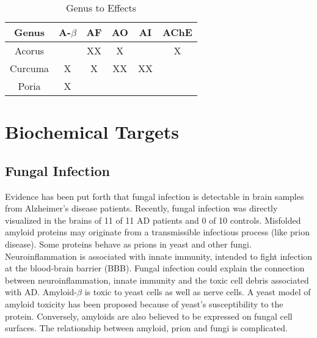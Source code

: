 \documentclass[twocolumn]{article}
\begin{document}
\begin{table*}[htp]
\centering

\begin{tabular}{||c c c c c c||}
 \hline
 Genus          & A-$\beta$ & AF & AO & AI & AChE \\
 \hline\hline
 Acorus         &           & XX &  X &    &   X  \\
 Curcuma        &     X     & X  & XX & XX &      \\
 Poria          &     X     &    &    &    &      \\
 \hline
\end{tabular}
\caption{Genus to Effects}
\label{table:effects}
\end{table*}



























\section{Biochemical Targets}


\subsection{Fungal Infection}

Evidence has been put forth that fungal infection is detectable
in brain samples from Alzheimer's disease patients.
\cite{alonso2013fungal}
Recently, fungal infection was directly visualized in the brains
of 11 of 11 AD patients and 0 of 10 controls.
\cite{pisa2015different}
Misfolded amyloid proteins may originate from a transmissible infectious process
(like prion disease).
Some proteins behave as prions in yeast and other fungi.
\cite{soto2006amyloids}
Neuroinflammation is associated with innate immunity,
intended to fight infection at the blood-brain barrier (BBB).
\cite{hauwel2005innate}
Fungal infection could explain the connection between
neuroinflammation, innate immunity and the toxic cell
debris associated with AD.
Amyloid-$\beta$ is toxic to yeast cells
as well as nerve cells.
A yeast model of amyloid toxicity has been proposed
because of yeast's susceptibility to the protein.
\cite{treusch2011functional}
Conversely, amyloids are also believed to be
expressed on fungal cell surfaces.
\cite{gebbink2005amyloids}
The relationship between amyloid, prion and fungi is complicated.
\cite{tessier2009unraveling}
\end{document}
